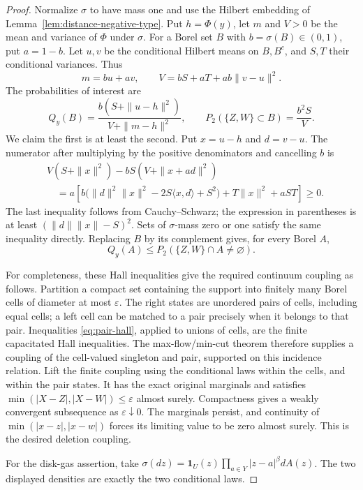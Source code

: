 \documentclass[11pt]{article}
\theoremstyle{remark}\newtheorem{remark}[theorem]{Remark}
\begin{document}
\begin{proof}
Normalize $\sigma$ to have mass one and use the Hilbert embedding of
Lemma~\ref{lem:distance-negative-type}.  Put $h=\Phi(y)$, let $m$ and
$V>0$ be the mean and variance of $\Phi$ under $\sigma$.
For a Borel set $B$ with $b=\sigma(B)\in(0,1)$, put $a=1-b$.
Let $u,v$ be the conditional Hilbert means on $B,B^c$, and $S,T$ their
conditional variances.  Thus
\[
 m=bu+av,\qquad V=bS+aT+ab\|v-u\|^2.
\]
The probabilities of interest are
\[
 Q_y(B)=\frac{b(S+\|u-h\|^2)}{V+\|m-h\|^2},
 \qquad P_2(\{Z,W\}\subset B)=\frac{b^2S}{V}.
\]
We claim the first is at least the second.  Put $x=u-h$ and $d=v-u$.
The numerator after multiplying by the positive denominators and
cancelling $b$ is
\begin{align*}
 &V(S+\|x\|^2)-bS(V+\|x+ad\|^2)\\
 &\quad=a\left[
 b\bigl(\|d\|^2\|x\|^2-2S\langle x,d\rangle+S^2\bigr)
 +T\|x\|^2+aST\right]\ge0.
\end{align*}
The last inequality follows from Cauchy--Schwarz; the expression
in parentheses is at least $(\|d\|\|x\|-S)^2$.
Sets of $\sigma$-mass zero or one satisfy the same inequality directly.
Replacing $B$ by its complement gives, for every Borel $A$,
\begin{equation}
 Q_y(A)\le P_2(\{Z,W\}\cap A\ne\varnothing).
 \label{eq:pair-hall}
\end{equation}

For completeness, these Hall inequalities give the required continuum
coupling as follows.  Partition a compact set containing the support
into finitely many Borel cells of diameter at most $\varepsilon$.
The right states are unordered pairs of cells, including equal cells;
a left cell can be matched to a pair precisely when it belongs to that
pair.  Inequalities \eqref{eq:pair-hall}, applied to unions of cells,
are the finite capacitated Hall inequalities.  The max-flow/min-cut
theorem therefore supplies a coupling of the cell-valued singleton
and pair, supported on this incidence relation.  Lift the finite
coupling using the conditional laws within the cells, and within the
pair states.  It has the exact original marginals and satisfies
$\min(|X-Z|,|X-W|)\le\varepsilon$ almost surely.  Compactness gives a
weakly convergent subsequence as $\varepsilon\downarrow0$.
The marginals persist, and continuity of
$\min(|x-z|,|x-w|)$ forces its limiting value to be zero almost surely.
This is the desired deletion coupling.

For the disk-gas assertion, take
$\sigma(dz)=\mathbf1_U(z)\prod_{a\in Y}|z-a|^\beta dA(z)$.
The two displayed densities are exactly the two conditional laws.
\end{proof}
\end{document}
